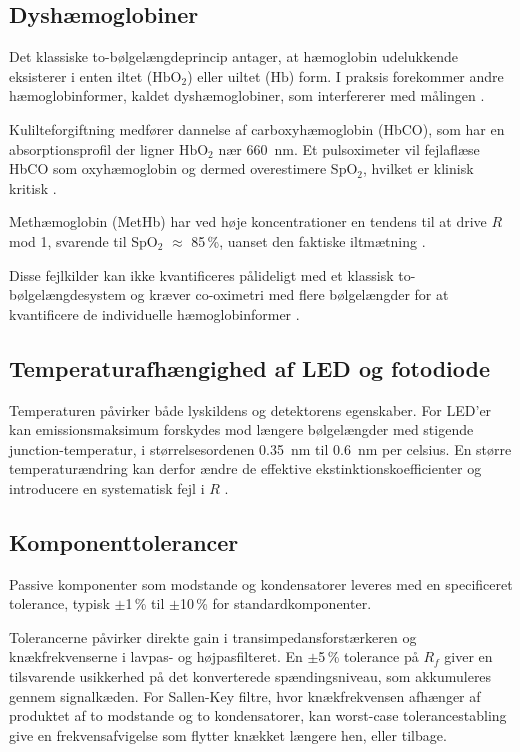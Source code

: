   
  \subsection{Dyshæmoglobiner}

Det klassiske to-bølgelængdeprincip antager, at hæmoglobin udelukkende eksisterer i enten iltet ($\text{HbO}_2$) eller uiltet ($\text{Hb}$) form. I praksis forekommer andre hæmoglobinformer, kaldet dyshæmoglobiner, som interfererer med målingen \cite{Webster1997,Ruberry2025}.

Kulilteforgiftning medfører dannelse af carboxyhæmoglobin (HbCO), som har en absorptionsprofil der ligner $\text{HbO}_2$ nær \SI{660}{nm}. Et pulsoximeter vil fejlaflæse HbCO som oxyhæmoglobin og dermed overestimere SpO$_2$, hvilket er klinisk kritisk \cite{Ruberry2025}.

Methæmoglobin (MetHb) har ved høje koncentrationer en tendens til at drive $R$ mod 1, svarende til SpO$_2$ $\approx$ 85\,\%, uanset den faktiske iltmætning \cite{Ruberry2025}.

Disse fejlkilder kan ikke kvantificeres pålideligt med et klassisk to-bølgelængdesystem og kræver co-oximetri med flere bølgelængder for at kvantificere de individuelle hæmoglobinformer \cite{Webster1997,Ruberry2025}.
  
  \subsection{Temperaturafhængighed af LED og fotodiode}

Temperaturen påvirker både lyskildens og detektorens egenskaber. For LED'er kan emissionsmaksimum forskydes mod længere bølgelængder med stigende junction-temperatur, i størrelsesordenen \SI{0.35}{nm} til \SI{0.6}{nm} per celsius. En større temperaturændring kan derfor ændre de effektive ekstinktionskoefficienter og introducere en systematisk fejl i $R$ \cite[s.~66]{Webster1997}.

  \subsection{Komponenttolerancer}

Passive komponenter som modstande og kondensatorer leveres med en specificeret tolerance, typisk $\pm$1\,\% til $\pm$10\,\% for standardkomponenter. 

Tolerancerne påvirker direkte gain i transimpedansforstærkeren og knækfrekvenserne i lavpas- og højpasfilteret. En $\pm$5\,\% tolerance på $R_f$ giver en tilsvarende usikkerhed på det konverterede spændingsniveau, som akkumuleres gennem signalkæden. For Sallen-Key filtre, hvor knækfrekvensen afhænger af produktet af to modstande og to kondensatorer, kan worst-case tolerancestabling give en frekvensafvigelse som flytter knækket længere hen, eller tilbage.
